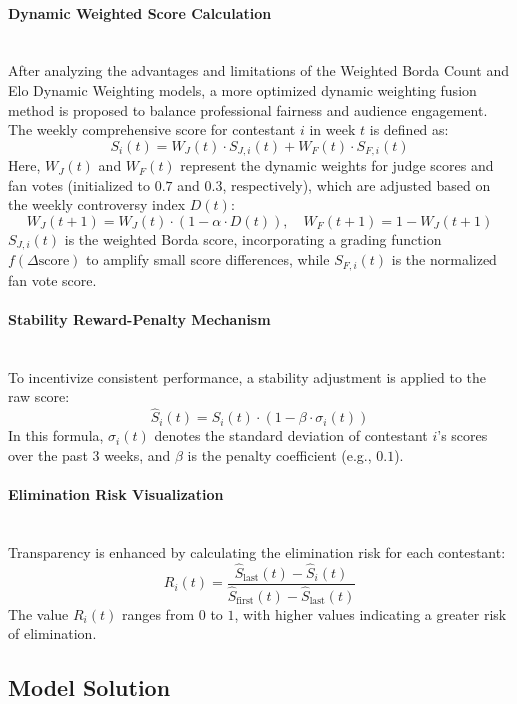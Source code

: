 \documentclass{mcmthesis}
\begin{document}
\paragraph{Dynamic Weighted Score Calculation}\hfill\\

After analyzing the advantages and limitations of the Weighted Borda Count and Elo Dynamic Weighting models, a more optimized dynamic weighting fusion method is proposed to balance professional fairness and audience engagement. The weekly comprehensive score for contestant $i$ in week $t$ is defined as:
\[
S_i(t) = W_J(t) \cdot S_{J,i}(t) + W_F(t) \cdot S_{F,i}(t)
\]
Here, $W_J(t)$ and $W_F(t)$ represent the dynamic weights for judge scores and fan votes (initialized to $0.7$ and $0.3$, respectively), which are adjusted based on the weekly controversy index $D(t)$:
\[
W_J(t+1) = W_J(t) \cdot (1 - \alpha \cdot D(t)),\quad W_F(t+1) = 1 - W_J(t+1)
\]
$S_{J,i}(t)$ is the weighted Borda score, incorporating a grading function $f(\Delta \text{score})$ to amplify small score differences, while $S_{F,i}(t)$ is the normalized fan vote score.

\paragraph{Stability Reward-Penalty Mechanism}\hfill\\

To incentivize consistent performance, a stability adjustment is applied to the raw score:
\[
\hat{S}_i(t) = S_i(t) \cdot \left(1 - \beta \cdot \sigma_i(t)\right)
\]
In this formula, $\sigma_i(t)$ denotes the standard deviation of contestant $i$'s scores over the past 3 weeks, and $\beta$ is the penalty coefficient (e.g., $0.1$).

\paragraph{Elimination Risk Visualization}\hfill\\

Transparency is enhanced by calculating the elimination risk for each contestant:
\[
R_i(t) = \frac{\hat{S}_{\text{last}}(t) - \hat{S}_i(t)}{\hat{S}_{\text{first}}(t) - \hat{S}_{\text{last}}(t)}
\]
The value $R_i(t)$ ranges from $0$ to $1$, with higher values indicating a greater risk of elimination.

\subsection{Model Solution}
\end{document}
